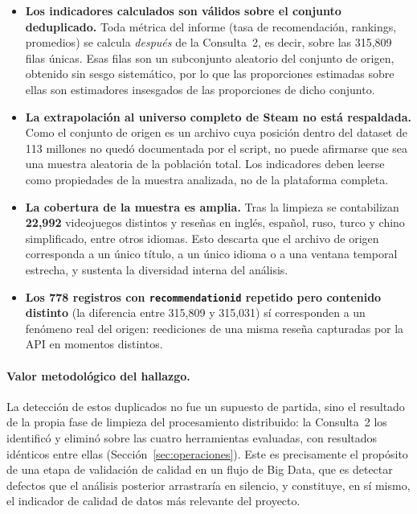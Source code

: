 \begin{itemize}[leftmargin=*]
    \item \textbf{Los indicadores calculados son válidos sobre el conjunto deduplicado.} Toda métrica del informe (tasa de recomendación, rankings, promedios) se calcula \textit{después} de la Consulta~2, es decir, sobre las 315,809 filas únicas. Esas filas son un subconjunto aleatorio del conjunto de origen, obtenido sin sesgo sistemático, por lo que las proporciones estimadas sobre ellas son estimadores insesgados de las proporciones de dicho conjunto.
    \item \textbf{La extrapolación al universo completo de Steam no está respaldada.} Como el conjunto de origen es un archivo cuya posición dentro del dataset de 113 millones no quedó documentada por el script, no puede afirmarse que sea una muestra aleatoria de la población total. Los indicadores deben leerse como propiedades de la muestra analizada, no de la plataforma completa.
    \item \textbf{La cobertura de la muestra es amplia.} Tras la limpieza se contabilizan \textbf{22,992} videojuegos distintos y reseñas en inglés, español, ruso, turco y chino simplificado, entre otros idiomas. Esto descarta que el archivo de origen corresponda a un único título, a un único idioma o a una ventana temporal estrecha, y sustenta la diversidad interna del análisis.
    \item \textbf{Los 778 registros con \texttt{recommendationid} repetido pero contenido distinto} (la diferencia entre 315,809 y 315,031) sí corresponden a un fenómeno real del origen: reediciones de una misma reseña capturadas por la API en momentos distintos.
\end{itemize}

\paragraph{Valor metodológico del hallazgo.} La detección de estos duplicados no fue un supuesto de partida, sino el resultado de la propia fase de limpieza del procesamiento distribuido: la Consulta~2 los identificó y eliminó sobre las cuatro herramientas evaluadas, con resultados idénticos entre ellas (Sección~\ref{sec:operaciones}). Este es precisamente el propósito de una etapa de validación de calidad en un flujo de Big Data, que es detectar defectos que el análisis posterior arrastraría en silencio, y constituye, en sí mismo, el indicador de calidad de datos más relevante del proyecto.


